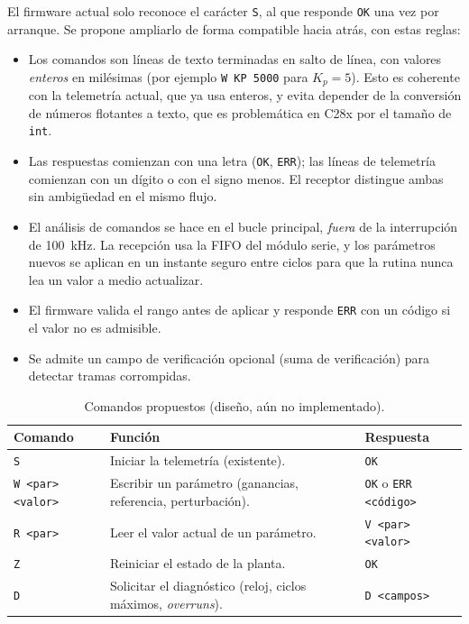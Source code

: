\documentclass[12pt,letterpaper]{article}
\begin{document}
El firmware actual solo reconoce el carácter \texttt{S}, al que responde \texttt{OK} una vez por arranque. Se propone ampliarlo de forma compatible hacia atrás, con estas reglas:
\begin{itemize}
    \item Los comandos son líneas de texto terminadas en salto de línea, con valores \emph{enteros} en milésimas (por ejemplo \texttt{W KP 5000} para $K_p=5$). Esto es coherente con la telemetría actual, que ya usa enteros, y evita depender de la conversión de números flotantes a texto, que es problemática en C28x por el tamaño de \texttt{int}.
    \item Las respuestas comienzan con una letra (\texttt{OK}, \texttt{ERR}); las líneas de telemetría comienzan con un dígito o con el signo menos. El receptor distingue ambas sin ambigüedad en el mismo flujo.
    \item El análisis de comandos se hace en el bucle principal, \emph{fuera} de la interrupción de 100~kHz. La recepción usa la FIFO del módulo serie, y los parámetros nuevos se aplican en un instante seguro entre ciclos para que la rutina nunca lea un valor a medio actualizar.
    \item El firmware valida el rango antes de aplicar y responde \texttt{ERR} con un código si el valor no es admisible.
    \item Se admite un campo de verificación opcional (suma de verificación) para detectar tramas corrompidas.
\end{itemize}

\begin{table}[!htbp]
\centering
\caption{Comandos propuestos (diseño, aún no implementado).}
\label{tab:cmd}
\begin{tabularx}{\textwidth}{>{\raggedright\arraybackslash}p{3.2cm}Y>{\raggedright\arraybackslash}p{3.4cm}}
\toprule
\textbf{Comando} & \textbf{Función} & \textbf{Respuesta} \\
\midrule
\texttt{S} & Iniciar la telemetría (existente). & \texttt{OK} \\
\texttt{W <par> <valor>} & Escribir un parámetro (ganancias, referencia, perturbación). & \texttt{OK} o \texttt{ERR <código>} \\
\texttt{R <par>} & Leer el valor actual de un parámetro. & \texttt{V <par> <valor>} \\
\texttt{Z} & Reiniciar el estado de la planta. & \texttt{OK} \\
\texttt{D} & Solicitar el diagnóstico (reloj, ciclos máximos, \textit{overruns}). & \texttt{D <campos>} \\
\bottomrule
\end{tabularx}
\end{table}
\end{document}

